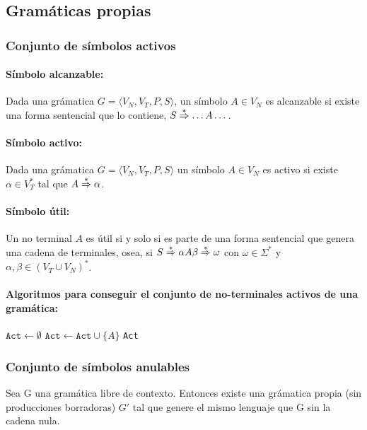 \subsection{Gramáticas propias}
\subsubsection{Conjunto de símbolos activos}
\paragraph{Símbolo alcanzable:} Dada una grámatica \(G=\langle V_N, V_T, P, S\rangle\), un símbolo \(A\in V_N\) es alcanzable si existe una forma sentencial que lo contiene,  \(S\overset{*}{\Rightarrow} \dots A\dots\).

\paragraph{Símbolo activo:} Dada una grámatica \(G =\langle V_N, V_T, P, S\rangle\) un símbolo \(A\in V_N\) es activo si existe \(\alpha\in V_T^*\) tal que \(A\overset{*}{\Rightarrow} \alpha\).

\paragraph{Símbolo útil:} Un no terminal \(A\) es útil si y solo si es parte de una forma sentencial que genera una cadena de terminales, osea, si \(S\overset{*}{\Rightarrow} \alpha A\beta \overset{*}{\Rightarrow} \omega\) con \(\omega \in \Sigma^*\) y \(\alpha, \beta \in (V_T\cup V_N)^*\).

\paragraph{Algoritmos para conseguir el conjunto de no-terminales activos de una gramática:}
\begin{algorithmic}
  \State \(\texttt{Act}\gets\emptyset\)
  \Repeat
  \State\(\texttt{Act}\leftarrow\texttt{Act}\cup \{A\}\)
  \EndIf
  \EndFor
  \State \Return \texttt{Act}
  \EndFunction
\end{algorithmic}

\subsubsection{Conjunto de símbolos anulables}
\begin{lemma}
  Sea G una gramática libre de contexto. Entonces existe una grámatica propia (sin producciones borradoras) \(G'\) tal que genere el mismo lenguaje que G sin la cadena nula.
\end{lemma}

